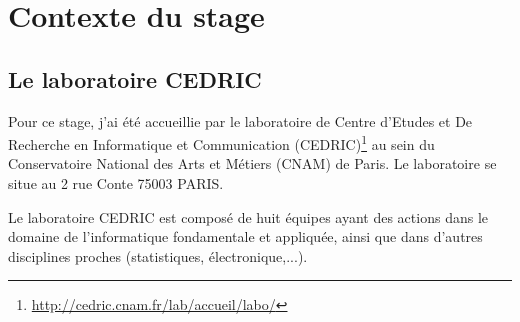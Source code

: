 \documentclass{article}
\begin{document}
\section{Contexte du stage}
	\subsection{Le laboratoire CEDRIC}
		Pour ce stage, j'ai été accueillie par le laboratoire de Centre d'Etudes et De Recherche en Informatique et Communication (CEDRIC)\footnote{\href{http://cedric.cnam.fr/lab/accueil/labo/}{http://cedric.cnam.fr/lab/accueil/labo/}} au sein du Conservatoire National des Arts et Métiers (CNAM) de Paris. 
		Le laboratoire se situe au 2 rue Conte 75003 PARIS.\par
		Le laboratoire CEDRIC est composé de huit équipes ayant des actions dans le domaine de l'informatique fondamentale et appliquée, ainsi que dans d'autres disciplines proches (statistiques, électronique,...).
\end{document}
